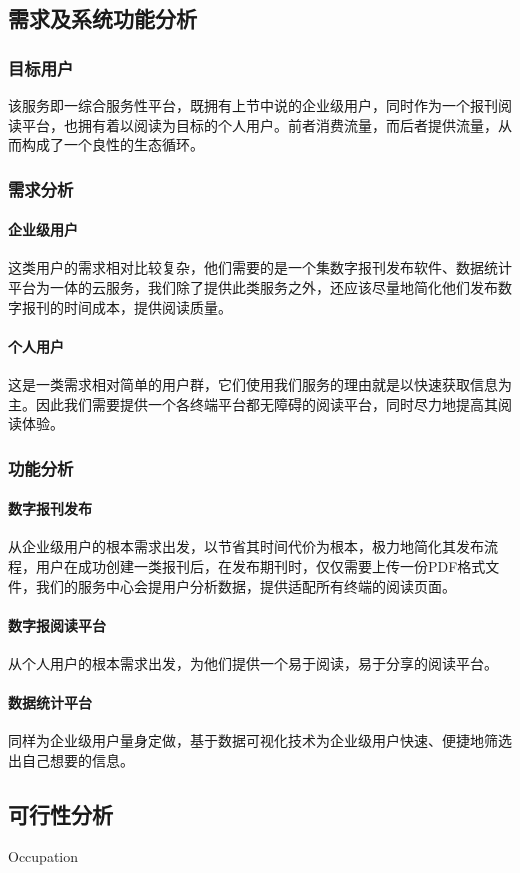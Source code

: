 
\subsection{需求及系统功能分析}
\subsubsection{目标用户}
该服务即一综合服务性平台，既拥有上节中说的企业级用户，同时作为一个报刊阅读平台，也拥有着以阅读为目标的个人用户。前者消费流量，而后者提供流量，从而构成了一个良性的生态循环。

\subsubsection{需求分析}
\paragraph{企业级用户}
这类用户的需求相对比较复杂，他们需要的是一个集数字报刊发布软件、数据统计平台为一体的云服务，我们除了提供此类服务之外，还应该尽量地简化他们发布数字报刊的时间成本，提供阅读质量。

\paragraph{个人用户}
这是一类需求相对简单的用户群，它们使用我们服务的理由就是以快速获取信息为主。因此我们需要提供一个各终端平台都无障碍的阅读平台，同时尽力地提高其阅读体验。

\subsubsection{功能分析}
\paragraph{数字报刊发布}
从企业级用户的根本需求出发，以节省其时间代价为根本，极力地简化其发布流程，用户在成功创建一类报刊后，在发布期刊时，仅仅需要上传一份PDF格式文件，我们的服务中心会提用户分析数据，提供适配所有终端的阅读页面。

\paragraph{数字报阅读平台}
从个人用户的根本需求出发，为他们提供一个易于阅读，易于分享的阅读平台。

\paragraph{数据统计平台}
同样为企业级用户量身定做，基于数据可视化技术为企业级用户快速、便捷地筛选出自己想要的信息。


\subsection{可行性分析}
\indent
Occupation